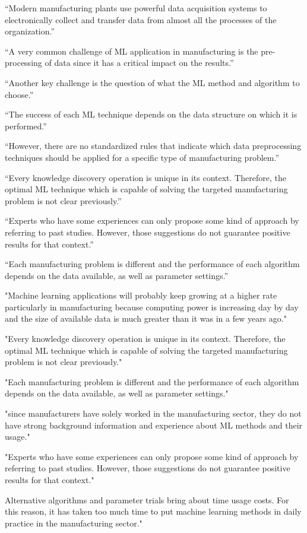 “Modern manufacturing plants use powerful data acquisition systems to electronically collect and transfer data from almost all the processes of the organization.”

“A very common challenge of ML application in manufacturing is the pre-processing of data since it has a critical impact on the results.”

“Another key challenge is the question of what the ML method and algorithm to choose.”

“The success of each ML technique depends on the data structure on which it is performed.”

“However, there are no standardized rules that indicate which data preprocessing techniques should be applied for a specific type of manufacturing problem.”

“Every knowledge discovery operation is unique in its context. Therefore, the optimal ML technique which is capable of solving the targeted manufacturing problem is not clear previously.”

“Experts who have some experiences can only propose some kind of approach by referring to past studies. However, those suggestions do not guarantee positive results for that context.”

“Each manufacturing problem is different and the performance of each algorithm depends on the data available, as well as parameter settings.”

"Machine learning applications will probably keep growing at a higher rate particularly in manufacturing because computing power is increasing day by day and the size of available data is much greater than it was in a few years ago."

"Every knowledge discovery operation is unique in its context. Therefore, the optimal ML technique which is capable of solving the targeted manufacturing problem is not clear previously."

"Each manufacturing problem is different and the performance of each algorithm depends on the data available, as well as parameter settings."

"since manufacturers have solely worked in the manufacturing sector, they do not have strong background information and experience about ML methods and their usage."

"Experts who have some experiences can only propose some kind of approach by referring to past studies. However, those suggestions do not guarantee positive results for that context."

Alternative algorithms and parameter trials bring about time usage costs. For this reason, it has taken too much time to put machine learning methods in daily practice in the manufacturing sector."

